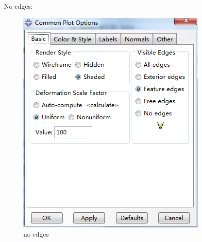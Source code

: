 \documentclass[10pt,a4paper]{article}
\begin{document}
No edges:

\begin{figure}[h!]
\centering
\includegraphics[width=0.5\linewidth]{no_edges}
\caption{no edges}
\label{fig:noedges}
\end{figure}
\end{document}
